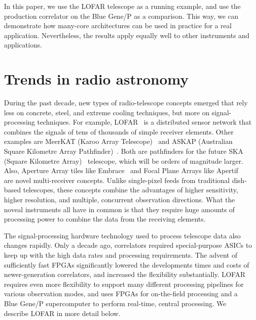 \documentclass{article}
\begin{document}
In this paper, we use the LOFAR telescope as a running example, and
use the production correlator on the Blue Gene/P as a comparison. This way,
we can demonstrate how many-core architectures can be used in practice for a real
application. Nevertheless, the results apply equally well to other
instruments and applications.


\section{Trends in radio astronomy}






During the past decade, new types of radio-telescope concepts emerged that
rely less on concrete, steel, and extreme cooling techniques, but more on
signal-processing techniques.
For example, LOFAR~\cite{Butcher:04,deVos:09} is a distributed sensor network
that combines the signals of tens of thousands of simple receiver elements.
Other examples are MeerKAT (Karoo Array Telescope)~\cite{meerkat} and
ASKAP (Australian Square Kilometre Array Pathfinder)~\cite{askap}. Both are
pathfinders for the future SKA (Square Kilometre Array)~\cite{ska} telescope, which
will be orders of magnitude larger.
Also, Aperture Array tiles like Embrace~\cite{embrace} and Focal Plane Arrays
like Apertif~\cite{apertif} are novel multi-receiver concepts.
Unlike single-pixel feeds from traditional dish-based telescopes, these
concepts combine the advantages of higher sensitivity, higher resolution,
and multiple, concurrent observation directions.
What the noveal instruments all have in common is that they require huge
amounts of processing power to combine the data from the receiving elements.

The signal-processing hardware technology used to process telescope
data also changes rapidly.  Only a decade ago, correlators required
special-purpose ASICs to keep up with the high data rates and
processing requirements.  The advent of sufficiently fast FPGAs
significantly lowered the developments times and costs of
newer-generation correlators, and increased the flexibility
substantially. LOFAR requires even more flexibility to support many
different processing pipelines for various observation modes, and uses
FPGAs for on-the-field processing and a Blue Gene/P
supercomputer to perform real-time, central processing.
We describe LOFAR in more detail below.
\end{document}
